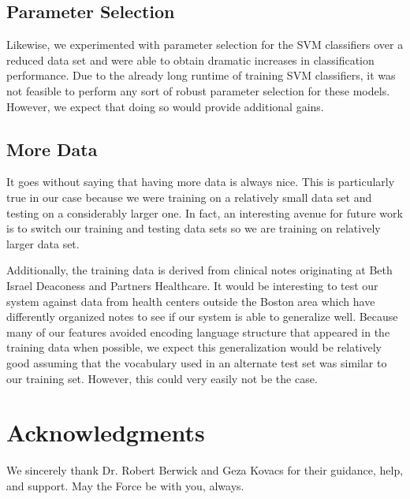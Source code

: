 \documentclass[preprint]{style}
\begin{document}
\subsection{Parameter Selection}
Likewise, we experimented with parameter selection for the SVM classifiers over a reduced data set and were able to obtain dramatic increases in classification performance. Due to the already long runtime of training SVM classifiers, it was not feasible to perform any sort of robust parameter selection for these models. However, we expect that doing so would provide additional gains.

\subsection{More Data}

It goes without saying that having more data is always nice. This is particularly true in our case because we were training on a relatively small data set and testing on a considerably larger one. In fact, an interesting avenue for future work is to switch our training and testing data sets so we are training on relatively larger data set.

Additionally, the training data is derived from clinical notes originating at Beth Israel Deaconess and Partners Healthcare. It would be interesting to test our system against data from health centers outside the Boston area which have differently organized notes to see if our system is able to generalize well. Because many of our features avoided encoding language structure that appeared in the training data when possible, we expect this generalization would be relatively good assuming that the vocabulary used in an alternate test set was similar to our training set. However, this could very easily not be the case.
	
\section{Acknowledgments}

We sincerely thank Dr. Robert Berwick  and Geza Kovacs
for their guidance, help, and support. May the Force be with you,
always.



%


\balancecolumns
\end{document}
